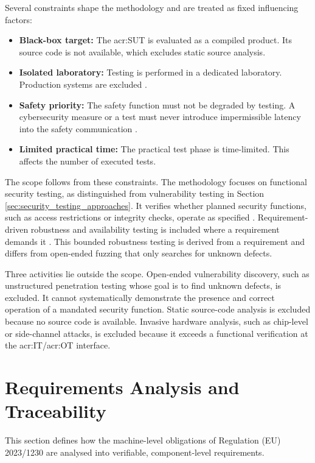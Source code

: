 Several constraints shape the methodology and are treated as fixed influencing factors: 
\begin{itemize} 
	\item \textbf{Black-box target:} The \gls{acr:SUT} is evaluated as a compiled product. Its source code is not available, which excludes static source analysis. 
	\item \textbf{Isolated laboratory:} Testing is performed in a dedicated laboratory. Production systems are excluded \cite[p. 116]{BSI2024ICSCompendium} \cite[p. 242]{NIST.SP.800-82r3}. 
	\item \textbf{Safety priority:} The safety function must not be degraded by testing. A cybersecurity measure or a test must never introduce impermissible latency into the safety communication \cite[p. 14]{prEN50742_2025}.
	\item \textbf{Limited practical time:} The practical test phase is time-limited. This affects the number of executed tests. 
\end{itemize} 

The scope follows from these constraints. The methodology focuses on functional security testing, as distinguished from vulnerability testing in Section \ref{sec:security_testing_approaches}. It verifies whether planned security functions, such as access restrictions or integrity checks, operate as specified \cite[p. 82]{1341418}. Requirement-driven robustness and availability testing is included where a requirement demands it \cite[p. 69]{prEN50742_2025}. This bounded robustness testing is derived from a requirement and differs from open-ended fuzzing that only searches for unknown defects. 

Three activities lie outside the scope. Open-ended vulnerability discovery, such as unstructured penetration testing whose goal is to find unknown defects, is excluded. It cannot systematically demonstrate the presence and correct operation of a mandated security function. Static source-code analysis is excluded because no source code is available. Invasive hardware analysis, such as chip-level or side-channel attacks, is excluded because it exceeds a functional verification at the \gls{acr:IT}/\gls{acr:OT} interface.





\section{Requirements Analysis and Traceability} 
\label{sec:requirements_analysis} 
This section defines how the machine-level obligations of Regulation (EU) 2023/1230 are analysed into verifiable, component-level requirements. 

